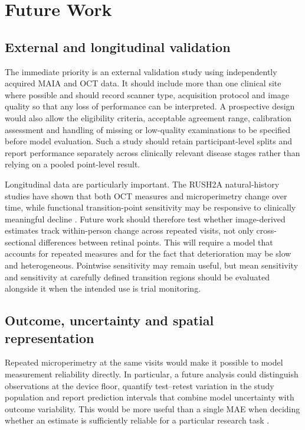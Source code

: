 \chapter{Future Work}
\label{chap:future-work}

\section{External and longitudinal validation}

The immediate priority is an external validation study using independently acquired MAIA and OCT data. It should include more than one clinical site where possible and should record scanner type, acquisition protocol and image quality so that any loss of performance can be interpreted. A prospective design would also allow the eligibility criteria, acceptable agreement range, calibration assessment and handling of missing or low-quality examinations to be specified before model evaluation. Such a study should retain participant-level splits and report performance separately across clinically relevant disease stages rather than relying on a pooled point-level result.

Longitudinal data are particularly important. The RUSH2A natural-history studies have shown that both OCT measures and microperimetry change over time, while functional transition-point sensitivity may be responsive to clinically meaningful decline \citep{Vincent2025,Maguire2024}. Future work should therefore test whether image-derived estimates track within-person change across repeated visits, not only cross-sectional differences between retinal points. This will require a model that accounts for repeated measures and for the fact that deterioration may be slow and heterogeneous. Pointwise sensitivity may remain useful, but mean sensitivity and sensitivity at carefully defined transition regions should be evaluated alongside it when the intended use is trial monitoring.

\section{Outcome, uncertainty and spatial representation}

Repeated microperimetry at the same visits would make it possible to model measurement reliability directly. In particular, a future analysis could distinguish observations at the device floor, quantify test--retest variation in the study population and report prediction intervals that combine model uncertainty with outcome variability. This would be more useful than a single MAE when deciding whether an estimate is sufficiently reliable for a particular research task \citep{Pfau2021Microperimetry,Karuntu2025}.

